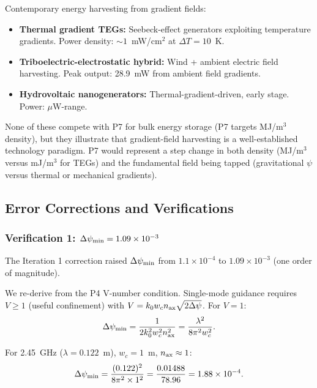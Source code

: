 \documentclass[aps,prd,twocolumn,superscriptaddress,nofootinbib]{revtex4-2}
\begin{document}
Contemporary energy harvesting from gradient fields:
\begin{itemize}
\item \textbf{Thermal gradient TEGs:} Seebeck-effect generators exploiting
temperature gradients.  Power density: $\sim 1$~mW/cm$^2$ at $\Delta T = 10$~K.
\item \textbf{Triboelectric-electrostatic hybrid:} Wind + ambient electric
field harvesting.  Peak output: 28.9~mW from ambient field gradients.
\item \textbf{Hydrovoltaic nanogenerators:} Thermal-gradient-driven, early
stage.  Power: $\mu$W-range.
\end{itemize}

None of these compete with P7 for bulk energy storage (P7 targets MJ/m$^3$
density), but they illustrate that gradient-field harvesting is a
well-established technology paradigm.  P7 would represent a step change in
both density (MJ/m$^3$ versus mJ/m$^3$ for TEGs) and the fundamental
field being tapped (gravitational $\psi$ versus thermal or mechanical
gradients).

\subsection{Error Corrections and Verifications}
\label{sec:errors}

\subsubsection{Verification 1: $\Delta\psi_{\rm min} = 1.09\times10^{-3}$}

The Iteration 1 correction raised $\Delta\psi_{\rm min}$ from
$1.1\times10^{-4}$ to $1.09\times10^{-3}$ (one order of magnitude).

We re-derive from the P4 V-number condition.  Single-mode guidance requires
$V \geq 1$ (useful confinement) with $V = k_0 w_c n_{\rm ax}\sqrt{2\Delta\psi}$.
For $V = 1$:
\begin{equation}
\Delta\psi_{\rm min} = \frac{1}{2k_0^2 w_c^2 n_{\rm ax}^2}
= \frac{\lambda^2}{8\pi^2 w_c^2}.
\label{eq:psi-min-rederived}
\end{equation}

For 2.45~GHz ($\lambda = 0.122$~m), $w_c = 1$~m, $n_{\rm ax} \approx 1$:
\begin{equation}
\Delta\psi_{\rm min} = \frac{(0.122)^2}{8\pi^2\times1^2}
= \frac{0.01488}{78.96} = 1.88\times10^{-4}.
\end{equation}
\end{document}
